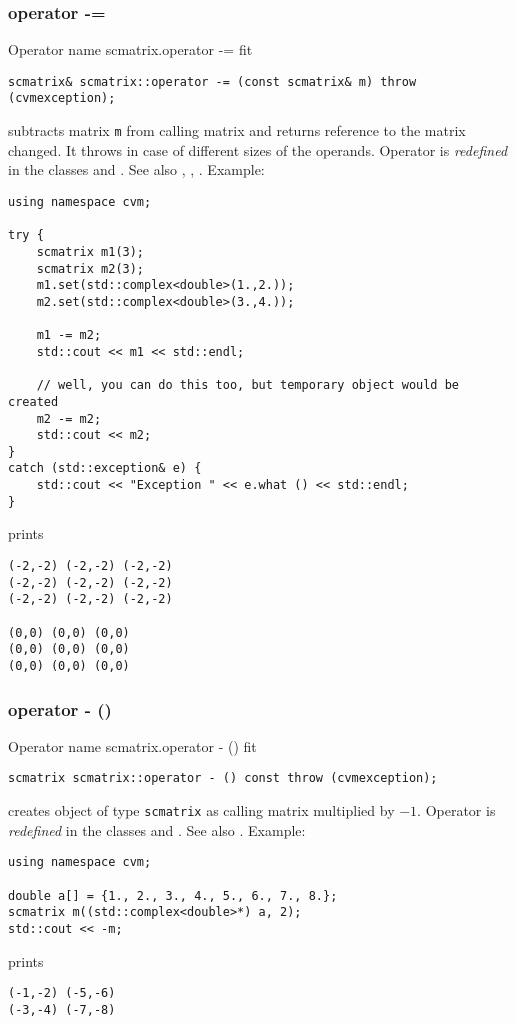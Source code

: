 \subsubsection{operator -=}
Operator%
\pdfdest name {scmatrix.operator -=} fit
\begin{verbatim}
scmatrix& scmatrix::operator -= (const scmatrix& m) throw (cvmexception);
\end{verbatim}
subtracts  matrix \verb"m" from  calling matrix
and returns  reference to
the matrix changed.
It throws  
in case of different sizes of the operands.
Operator is \emph{redefined} in the classes
and .
See also ,
,
.
Example:
\begin{Verbatim}
using namespace cvm;

try {
    scmatrix m1(3);
    scmatrix m2(3);
    m1.set(std::complex<double>(1.,2.));
    m2.set(std::complex<double>(3.,4.));

    m1 -= m2;
    std::cout << m1 << std::endl;

    // well, you can do this too, but temporary object would be created
    m2 -= m2; 
    std::cout << m2;
}
catch (std::exception& e) {
    std::cout << "Exception " << e.what () << std::endl;
}
\end{Verbatim}
prints
\begin{Verbatim}
(-2,-2) (-2,-2) (-2,-2)
(-2,-2) (-2,-2) (-2,-2)
(-2,-2) (-2,-2) (-2,-2)

(0,0) (0,0) (0,0)
(0,0) (0,0) (0,0)
(0,0) (0,0) (0,0)
\end{Verbatim}
\newpage




\subsubsection{operator - ()}
Operator%
\pdfdest name {scmatrix.operator - ()} fit
\begin{verbatim}
scmatrix scmatrix::operator - () const throw (cvmexception);
\end{verbatim}
creates  object of type \verb"scmatrix" as
 calling matrix multiplied by $-1$.
Operator is \emph{redefined} in the classes
and .
See also .
Example:
\begin{Verbatim}
using namespace cvm;

double a[] = {1., 2., 3., 4., 5., 6., 7., 8.};
scmatrix m((std::complex<double>*) a, 2);
std::cout << -m;
\end{Verbatim}
prints
\begin{Verbatim}
(-1,-2) (-5,-6)
(-3,-4) (-7,-8)
\end{Verbatim}
\newpage



